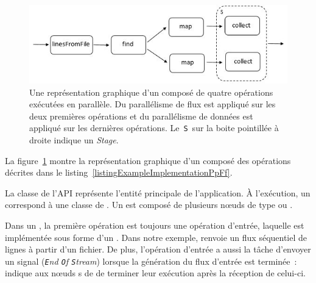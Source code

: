 

\begin{figure}
\centering
     \includegraphics[width=\textwidth]{Figures/ExempleRuntimeExecution.jpg}
      \caption[Une repr\'esentation graphique d'un  compos\'e de quatre op\'erations.]{Une repr\'esentation graphique d'un  compos\'e de quatre op\'erations ex\'ecut\'ees en parall\`ele. Du parall\'elisme de flux est appliqu\'e sur les deux premi\`eres op\'erations et du parall\'elisme de donn\'ees est appliqu\'e sur les derni\`eres op\'erations. Le~\texttt{S}~sur la boite pointill\'ee \`a droite indique un \emph{Stage}.}
       \label{ExempleRuntimeExecution.fig}
\end{figure}



La figure~\ref{ExempleRuntimeExecution.fig} montre la repr\'esentation graphique d'un  compos\'e des op\'erations d\'ecrites dans le listing~\ref{listingExampleImplementationPpFf}.
 

La classe  de l'API repr\'esente l'entit\'e principale de l'application. \`A l'ex\'ecution, un  correspond \`a une classe  de . Un  est compos\'e de plusieurs nœuds de type  ou . 

Dans un , la premi\`ere op\'eration est toujours une op\'eration d'entr\'ee, laquelle est impl\'ement\'ee sous forme d'un . Dans notre exemple,  renvoie un flux s\'equentiel de lignes \`a partir d'un fichier. De plus, l'op\'eration d'entr\'ee a aussi la t\^ache d'envoyer un signal  (\emph{\texttt{E}nd \texttt{O}f \texttt{S}tream}) lorsque la g\'en\'eration du flux d'entr\'ee est termin\'ee~:  indique aux nœuds s de  de terminer leur ex\'ecution apr\`es la r\'eception de celui-ci.

